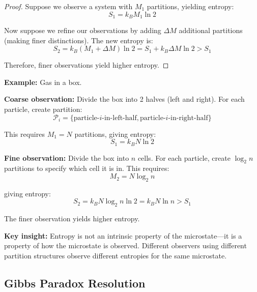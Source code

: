 \documentclass[twocolumn,10pt]{article}
\theoremstyle{definition}
\theoremstyle{remark}
\begin{document}
\begin{proof}
Suppose we observe a system with $M_1$ partitions, yielding entropy:
\begin{equation}
S_1 = k_B M_1 \ln 2
\end{equation}

Now suppose we refine our observations by adding $\Delta M$ additional partitions (making finer distinctions). The new entropy is:
\begin{equation}
S_2 = k_B (M_1 + \Delta M) \ln 2 = S_1 + k_B \Delta M \ln 2 > S_1
\end{equation}

Therefore, finer observations yield higher entropy.
\end{proof}

\noindent\textbf{Example:} Gas in a box.

\textbf{Coarse observation:} Divide the box into 2 halves (left and right). For each particle, create partition:
\begin{equation}
\mathcal{P}_i = \{\text{particle-}i\text{-in-left-half}, \text{particle-}i\text{-in-right-half}\}
\end{equation}

This requires $M_1 = N$ partitions, giving entropy:
\begin{equation}
S_1 = k_B N \ln 2
\end{equation}

\textbf{Fine observation:} Divide the box into $n$ cells. For each particle, create $\log_2 n$ partitions to specify which cell it is in. This requires:
\begin{equation}
M_2 = N \log_2 n
\end{equation}

giving entropy:
\begin{equation}
S_2 = k_B N \log_2 n \ln 2 = k_B N \ln n > S_1
\end{equation}

The finer observation yields higher entropy.

\vspace{0.2cm}
\noindent\textbf{Key insight:} Entropy is not an intrinsic property of the microstate—it is a property of how the microstate is observed. Different observers using different partition structures observe different entropies for the same microstate.

\subsection{Gibbs Paradox Resolution}
\end{document}
